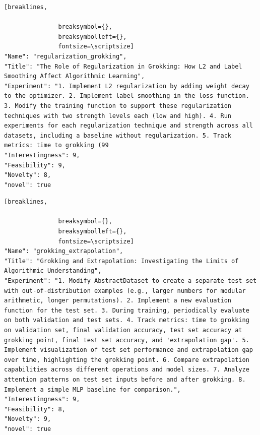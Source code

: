\begin{tcolorbox}[
  breakable,
  colback  = blue!5!white,
  colframe = blue!75!black,
  title    = {Idea 11/50 - \texttt{regularization\_grokking}},
  fontupper=\scriptsize\ttfamily,
]
\begin{Verbatim}[breaklines,

               breaksymbol={},
               breaksymbolleft={},
               fontsize=\scriptsize]
"Name": "regularization_grokking",
"Title": "The Role of Regularization in Grokking: How L2 and Label Smoothing Affect Algorithmic Learning",
"Experiment": "1. Implement L2 regularization by adding weight decay to the optimizer. 2. Implement label smoothing in the loss function. 3. Modify the training function to support these regularization techniques with two strength levels each (low and high). 4. Run experiments for each regularization technique and strength across all datasets, including a baseline without regularization. 5. Track metrics: time to grokking (99
"Interestingness": 9,
"Feasibility": 9,
"Novelty": 8,
"novel": true
\end{Verbatim}
\end{tcolorbox}

\begin{tcolorbox}[
  breakable,
  colback  = blue!5!white,
  colframe = blue!75!black,
  title    = {Idea 12/50 - \texttt{grokking\_extrapolation}},
  fontupper=\scriptsize\ttfamily,
]
\begin{Verbatim}[breaklines,

               breaksymbol={},
               breaksymbolleft={},
               fontsize=\scriptsize]
"Name": "grokking_extrapolation",
"Title": "Grokking and Extrapolation: Investigating the Limits of Algorithmic Understanding",
"Experiment": "1. Modify AbstractDataset to create a separate test set with out-of-distribution examples (e.g., larger numbers for modular arithmetic, longer permutations). 2. Implement a new evaluation function for the test set. 3. During training, periodically evaluate on both validation and test sets. 4. Track metrics: time to grokking on validation set, final validation accuracy, test set accuracy at grokking point, final test set accuracy, and 'extrapolation gap'. 5. Implement visualization of test set performance and extrapolation gap over time, highlighting the grokking point. 6. Compare extrapolation capabilities across different operations and model sizes. 7. Analyze attention patterns on test set inputs before and after grokking. 8. Implement a simple MLP baseline for comparison.",
"Interestingness": 9,
"Feasibility": 8,
"Novelty": 9,
"novel": true
\end{Verbatim}
\end{tcolorbox}

